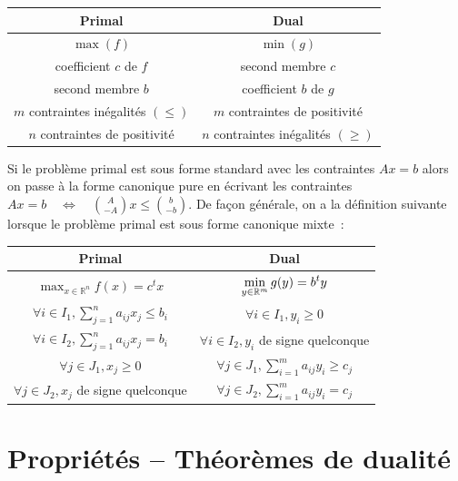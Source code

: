 \documentclass[a4paper,12pt,openany]{book}
\theoremstyle{plain}
\theoremstyle{definition}
\theoremstyle{remark}
\theoremstyle{nbstyle}
\begin{document}
	\begin{center}
		\begin{tabular}{|c|c|}
			\hline
			Primal & Dual \\
			\hline
			$\displaystyle\max (f)$ & $\displaystyle\min (g)$ \\
			coefficient $c$ de $f$ & second membre $c$ \\
			second membre $b$ & coefficient $b$ de $g$ \\
			$m$ contraintes inégalités $(\leq)$ & $m$ contraintes de positivité \\
			$n$ contraintes de positivité & $n$ contraintes inégalités $(\geq)$ \\
			\hline
		\end{tabular}
	\end{center}
	
	Si le problème primal est sous forme standard avec les contraintes $A x=b$ alors on passe à la forme canonique pure en écrivant les contraintes $A x=b \quad \Longleftrightarrow \quad \binom{A}{-A} x \leq \binom{b}{-b}$. De façon générale, on a la définition suivante lorsque le problème primal est sous forme canonique mixte~:
	
	\begin{center}
		\begin{tabular}{|c|c|}
			\hline
			Primal & Dual \\
			\hline
			$\displaystyle\max_{x \in \mathbb{R}^{n}} f(x)=c^{t} x$ & $\displaystyle\displaystyle\min_{y \in \mathbb{R}^{m}} g(y)=b^{t} y$ \\
			$\forall i \in I_{1}, \displaystyle\sum_{j=1}^{n} a_{ij} x_{j} \leq b_{i}$ & $\forall i \in I_{1}, y_{i} \geq 0$ \\
			$\forall i \in I_{2}, \displaystyle\sum_{j=1}^{n} a_{ij} x_{j}=b_{i}$ & $\forall i \in I_{2}, y_{i}$ de signe quelconque \\
			$\forall j \in J_{1}, x_{j} \geq 0$ & $\forall j \in J_{1}, \displaystyle\sum_{i=1}^{m} a_{ij} y_{i} \geq c_{j}$ \\
			$\forall j \in J_{2}, x_{j}$ de signe quelconque & $\forall j \in J_{2}, \displaystyle\sum_{i=1}^{m} a_{ij} y_{i}=c_{j}$ \\
			\hline
		\end{tabular}
	\end{center}
	
	\section{Propriétés -- Théorèmes de dualité}
	
\end{document}
